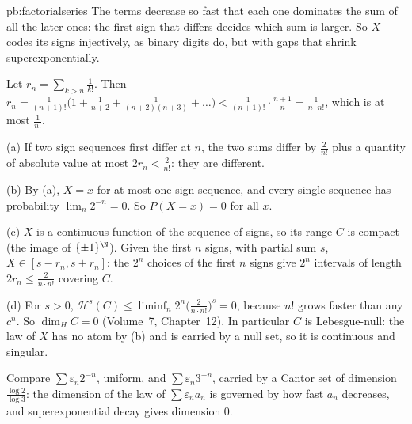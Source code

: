 \begin{solution}{pb:factorialseries}
\idea The terms decrease so fast that each one dominates the sum of all the later ones: the first sign that differs decides which sum is larger. So $X$ codes its signs
injectively, as binary digits do, but with gaps that shrink superexponentially.

\writeup Let $r_n=\sum_{k>n}\frac1{k!}$. Then $r_n=\frac1{(n+1)!}\bigl(1+\frac1{n+2}+\frac1{(n+2)(n+3)}+\dots\bigr)<\frac1{(n+1)!}\cdot\frac{n+1}n=\frac1{n\cdot n!}$, which is at most $\frac1{n!}$.

(a) If two sign sequences first differ at $n$, the two sums differ by $\frac2{n!}$ plus a quantity of absolute value at most $2r_n<\frac2{n!}$: they are different.

(b) By (a), $X=x$ for at most one sign sequence, and every single sequence has probability $\lim_n2^{-n}=0$. So $P(X=x)=0$ for all $x$.

(c) $X$ is a continuous function of the sequence of signs, so its range $C$ is compact (the image of $\{\pm1\}^{\N}$). Given the first $n$ signs, with partial sum $s$,
$X\in[s-r_n,s+r_n]$: the $2^n$ choices of the first $n$ signs give $2^n$ intervals of length $2r_n\le\frac2{n\cdot n!}$ covering $C$.

(d) For $s>0$, $\mathcal H^s(C)\le\liminf_n2^n\bigl(\frac2{n\cdot n!}\bigr)^s=0$, because $n!$ grows faster than any $c^n$. So $\dim_HC=0$ (Volume~7, Chapter~12). In particular $C$ is
Lebesgue-null: the law of $X$ has no atom by (b) and is carried by a null set, so it is continuous and singular.

\leads Compare $\sum\varepsilon_n2^{-n}$, uniform, and $\sum\varepsilon_n3^{-n}$, carried by a Cantor set of dimension $\frac{\log2}{\log3}$: the dimension of the law of
$\sum\varepsilon_na_n$ is governed by how fast $a_n$ decreases, and superexponential decay gives dimension $0$.
\end{solution}

